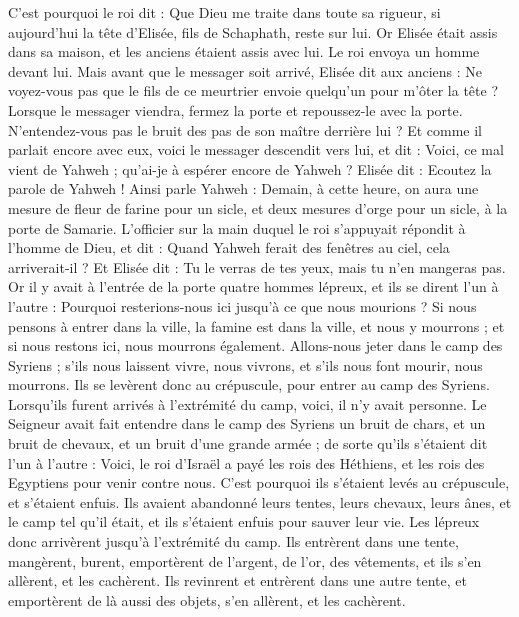 \begin{multicols}{2}
C’est pourquoi le roi dit : Que Dieu me traite dans toute sa rigueur, si aujourd’hui la tête d’Elisée, fils de Schaphath, reste sur lui.
Or Elisée était assis dans sa maison, et les anciens étaient assis avec lui. Le roi envoya un homme devant lui. Mais avant que le messager soit arrivé, Elisée dit aux anciens : Ne voyez-vous pas que le fils de ce meurtrier envoie quelqu’un pour m’ôter la tête ? Lorsque le messager viendra, fermez la porte et repoussez-le avec la porte. N’entendez-vous pas le bruit des pas de son maître derrière lui ?
Et comme il parlait encore avec eux, voici le messager descendit vers lui, et dit : Voici, ce mal vient de Yahweh ; qu’ai-je à espérer encore de Yahweh ?
\VerseOne{}Elisée dit : Ecoutez la parole de Yahweh ! Ainsi parle Yahweh : Demain, à cette heure, on aura une mesure de fleur de farine pour un sicle, et deux mesures d’orge pour un sicle, à la porte de Samarie.
L’officier sur la main duquel le roi s’appuyait répondit à l’homme de Dieu, et dit : Quand Yahweh ferait des fenêtres au ciel, cela arriverait-il ? Et Elisée dit : Tu le verras de tes yeux, mais tu n’en mangeras pas.
Or il y avait à l’entrée de la porte quatre hommes lépreux, et ils se dirent l’un à l’autre : Pourquoi resterions-nous ici jusqu’à ce que nous mourions ?
Si nous pensons à entrer dans la ville, la famine est dans la ville, et nous y mourrons ; et si nous restons ici, nous mourrons également. Allons-nous jeter dans le camp des Syriens ; s’ils nous laissent vivre, nous vivrons, et s’ils nous font mourir, nous mourrons.
Ils se levèrent donc au crépuscule, pour entrer au camp des Syriens. Lorsqu’ils furent arrivés à l’extrémité du camp, voici, il n’y avait personne.
Le Seigneur avait fait entendre dans le camp des Syriens un bruit de chars, et un bruit de chevaux, et un bruit d’une grande armée ; de sorte qu’ils s’étaient dit l’un à l’autre : Voici, le roi d’Israël a payé les rois des Héthiens, et les rois des Egyptiens pour venir contre nous.
C’est pourquoi ils s’étaient levés au crépuscule, et s’étaient enfuis. Ils avaient abandonné leurs tentes, leurs chevaux, leurs ânes, et le camp tel qu’il était, et ils s’étaient enfuis pour sauver leur vie.
Les lépreux donc arrivèrent jusqu’à l’extrémité du camp. Ils entrèrent dans une tente, mangèrent, burent, emportèrent de l’argent, de l’or, des vêtements, et ils s’en allèrent, et les cachèrent. Ils revinrent et entrèrent dans une autre tente, et emportèrent de là aussi des objets, s’en allèrent, et les cachèrent.

\end{multicols}
